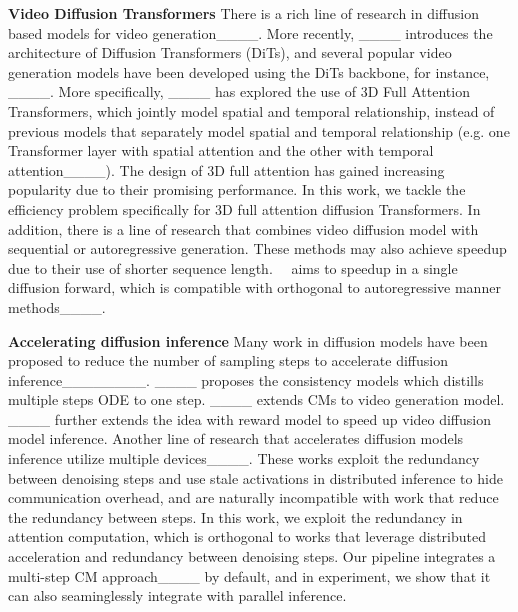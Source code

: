 \textbf{Video Diffusion Transformers} There is a rich line of research in diffusion based models for video generation____. More recently, ____ introduces the architecture of Diffusion Transformers (DiTs), and several popular video generation models have been developed using the DiTs backbone, for instance, ____. More specifically, ____ has explored the use of 3D Full Attention Transformers, which jointly model spatial and temporal relationship, instead of previous models that separately model spatial and temporal relationship (e.g. one Transformer layer with spatial attention and the other with temporal attention____). The design of 3D full attention has gained increasing popularity due to their promising performance. In this work, we tackle the efficiency problem specifically for 3D full attention diffusion Transformers. In addition, there is a line of research that combines video diffusion model with sequential or autoregressive generation. These methods may also achieve speedup due to their use of shorter sequence length. ~\methodname~aims to speedup in a single diffusion forward, which is compatible with orthogonal to autoregressive manner methods____. 

\textbf{Accelerating diffusion inference} 
Many work in diffusion models have been proposed to reduce the number of sampling steps to accelerate diffusion inference________.  ____ proposes the consistency models which distills multiple steps ODE to one step. ____ extends CMs to video generation model. ____ further extends the idea with reward model to speed up video diffusion model inference. 
Another line of research that accelerates diffusion models inference utilize multiple devices____. These works exploit the redundancy between denoising steps and use stale activations in distributed inference to hide communication overhead, and are naturally incompatible with work that reduce the redundancy between steps. In this work, we exploit the redundancy in attention computation, which is orthogonal to works that leverage distributed acceleration and redundancy between denoising steps. Our pipeline integrates a multi-step CM approach____ by default, and in experiment, we show that it can also seaminglessly integrate with parallel inference.

